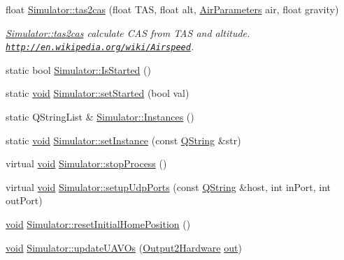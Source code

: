 \begin{DoxyCompactItemize}
float \hyperlink{group___h_i_t_l_plugin_gaf6d17454fad82383037d44ed3cb93a12}{\-Simulator\-::tas2cas} (float \-T\-A\-S, float alt, \hyperlink{struct_air_parameters}{\-Air\-Parameters} air, float gravity)
\begin{DoxyCompactList}\small\item\em \hyperlink{group___h_i_t_l_plugin_gaf6d17454fad82383037d44ed3cb93a12}{\-Simulator\-::tas2cas} calculate \-C\-A\-S from \-T\-A\-S and altitude. \href{http://en.wikipedia.org/wiki/Airspeed}{\tt http\-://en.\-wikipedia.\-org/wiki/\-Airspeed}. \end{DoxyCompactList}\item 
static bool \hyperlink{group___h_i_t_l_plugin_gab258fc4b0cfb2d1fc7cfc2e39f12295f}{\-Simulator\-::\-Is\-Started} ()
\item 
static \hyperlink{group___u_a_v_objects_plugin_ga444cf2ff3f0ecbe028adce838d373f5c}{void} \hyperlink{group___h_i_t_l_plugin_ga077a3be12724a8b465c5ed557abbca33}{\-Simulator\-::set\-Started} (bool val)
\item 
static \-Q\-String\-List \& \hyperlink{group___h_i_t_l_plugin_ga7a56fe71f90b375de179eea6369025c9}{\-Simulator\-::\-Instances} ()
\item 
static \hyperlink{group___u_a_v_objects_plugin_ga444cf2ff3f0ecbe028adce838d373f5c}{void} \hyperlink{group___h_i_t_l_plugin_ga8f691dedcee72e956c36f52009718cad}{\-Simulator\-::set\-Instance} (const \hyperlink{group___u_a_v_objects_plugin_gab9d252f49c333c94a72f97ce3105a32d}{\-Q\-String} \&str)
\item 
virtual \hyperlink{group___u_a_v_objects_plugin_ga444cf2ff3f0ecbe028adce838d373f5c}{void} \hyperlink{group___h_i_t_l_plugin_ga12b351ec9ec8410a28d4f0f3d04ef9b6}{\-Simulator\-::stop\-Process} ()
\item 
virtual \hyperlink{group___u_a_v_objects_plugin_ga444cf2ff3f0ecbe028adce838d373f5c}{void} \hyperlink{group___h_i_t_l_plugin_ga106e46211d3a00bd4a7b3b3918b23f63}{\-Simulator\-::setup\-Udp\-Ports} (const \hyperlink{group___u_a_v_objects_plugin_gab9d252f49c333c94a72f97ce3105a32d}{\-Q\-String} \&host, int in\-Port, int out\-Port)
\item 
\hyperlink{group___u_a_v_objects_plugin_ga444cf2ff3f0ecbe028adce838d373f5c}{void} \hyperlink{group___h_i_t_l_plugin_ga23bcac84c193a077fca82e61e250b99f}{\-Simulator\-::reset\-Initial\-Home\-Position} ()
\item 
\hyperlink{group___u_a_v_objects_plugin_ga444cf2ff3f0ecbe028adce838d373f5c}{void} \hyperlink{group___h_i_t_l_plugin_gad1625bf27fadfc6a51218ad76d9926a6}{\-Simulator\-::update\-U\-A\-V\-Os} (\hyperlink{struct_output2_hardware}{\-Output2\-Hardware} \hyperlink{uavobjecttemplate_8m_a2a89187d8e8e8fba509ef9ab5f815d88}{out})

\end{DoxyCompactItemize}
